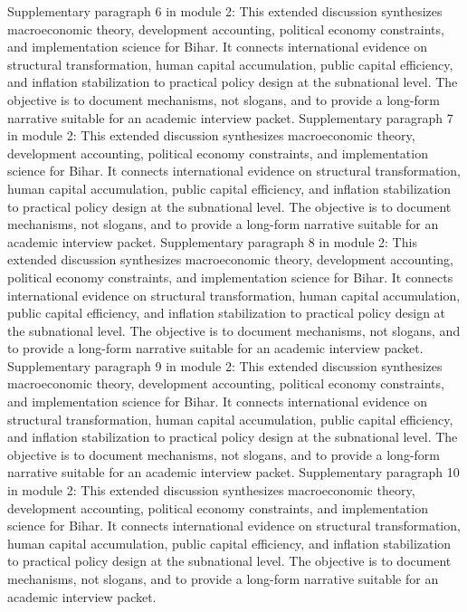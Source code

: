 \documentclass[preprint,12pt]{elsarticle}
\begin{document}
Supplementary paragraph 6 in module 2: This extended discussion synthesizes macroeconomic theory, development accounting, political economy constraints, and implementation science for Bihar. It connects international evidence on structural transformation, human capital accumulation, public capital efficiency, and inflation stabilization to practical policy design at the subnational level. The objective is to document mechanisms, not slogans, and to provide a long-form narrative suitable for an academic interview packet.
Supplementary paragraph 7 in module 2: This extended discussion synthesizes macroeconomic theory, development accounting, political economy constraints, and implementation science for Bihar. It connects international evidence on structural transformation, human capital accumulation, public capital efficiency, and inflation stabilization to practical policy design at the subnational level. The objective is to document mechanisms, not slogans, and to provide a long-form narrative suitable for an academic interview packet.
Supplementary paragraph 8 in module 2: This extended discussion synthesizes macroeconomic theory, development accounting, political economy constraints, and implementation science for Bihar. It connects international evidence on structural transformation, human capital accumulation, public capital efficiency, and inflation stabilization to practical policy design at the subnational level. The objective is to document mechanisms, not slogans, and to provide a long-form narrative suitable for an academic interview packet.
Supplementary paragraph 9 in module 2: This extended discussion synthesizes macroeconomic theory, development accounting, political economy constraints, and implementation science for Bihar. It connects international evidence on structural transformation, human capital accumulation, public capital efficiency, and inflation stabilization to practical policy design at the subnational level. The objective is to document mechanisms, not slogans, and to provide a long-form narrative suitable for an academic interview packet.
Supplementary paragraph 10 in module 2: This extended discussion synthesizes macroeconomic theory, development accounting, political economy constraints, and implementation science for Bihar. It connects international evidence on structural transformation, human capital accumulation, public capital efficiency, and inflation stabilization to practical policy design at the subnational level. The objective is to document mechanisms, not slogans, and to provide a long-form narrative suitable for an academic interview packet.
\end{document}
